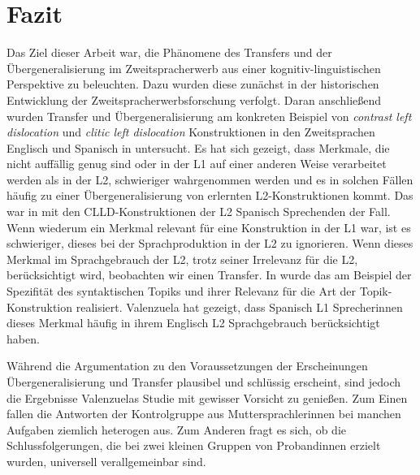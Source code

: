 \section{Fazit}

\begin{comment}
    * Einleitung und Fazit müssen zusammenpassen.
    * sind die Erkenntnisse im Fazit aus der Arbeit ableitbar?
    * Vorgehensweise zusammenfassen

Kritische Zusammenfassung
\begin{itemize}
    \item was war in den Texten nicht so gelungen?
    \item welche Fragen sind offen geblieben?
    \item in welche Richtung kann noch weiter geforscht werden?
    \item was sind gegnerische Meinungen zum Thema?
\end{itemize}
\end{comment}


Das Ziel dieser Arbeit war, die Phänomene des Transfers und der Übergeneralisierung im Zweitspracherwerb aus einer kognitiv-linguistischen Perspektive zu beleuchten.
Dazu wurden diese zunächst in der historischen Entwicklung der Zweitspracherwerbsforschung verfolgt.
Daran anschließend wurden Transfer und Übergeneralisierung am konkreten Beispiel von \textit{contrast left dislocation} und \textit{clitic left dislocation} Konstruktionen in den Zweitsprachen Englisch und Spanisch in \cite[][]{Valenzuela05} untersucht.
Es hat sich gezeigt, dass Merkmale, die nicht auffällig genug sind oder in der L1 auf einer anderen Weise verarbeitet werden als in der L2, schwieriger wahrgenommen werden
und es in solchen Fällen häufig zu einer Übergeneralisierung von erlernten L2-Konstruktionen kommt.
Das war in \cite[][]{Valenzuela05} mit den CLLD-Konstruktionen der L2 Spanisch Sprechenden der Fall.
Wenn wiederum ein Merkmal relevant für eine Konstruktion in der L1 war, ist es schwieriger, dieses bei der Sprachproduktion in der L2 zu ignorieren.
Wenn dieses Merkmal im Sprachgebrauch der L2, trotz seiner Irrelevanz für die L2, berücksichtigt wird, beobachten wir einen Transfer.
In \cite[][]{Valenzuela05} wurde das am Beispiel der Spezifität des syntaktischen Topiks und ihrer Relevanz für die Art der Topik-Konstruktion realisiert.
Valenzuela hat gezeigt, dass Spanisch L1 Sprecherinnen dieses Merkmal häufig in ihrem Englisch L2 Sprachgebrauch berücksichtigt haben.

Während die Argumentation zu den Voraussetzungen der Erscheinungen Übergeneralisierung und Transfer plausibel und schlüssig erscheint, sind jedoch die Ergebnisse Valenzuelas Studie \cite[][]{Valenzuela05} mit gewisser Vorsicht zu genießen.
Zum Einen fallen die Antworten der Kontrolgruppe aus Muttersprachlerinnen bei manchen Aufgaben ziemlich heterogen aus.
Zum Anderen fragt es sich, ob die Schlussfolgerungen, die bei zwei kleinen Gruppen von Probandinnen erzielt wurden, universell verallgemeinbar sind.

